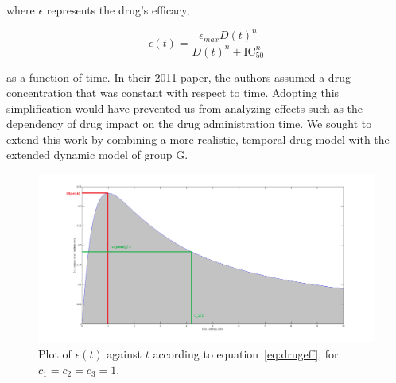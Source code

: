 \documentclass[a4paper, 12pt]{report}
\begin{document}
where $\epsilon$ represents the drug's efficacy,

\begin{equation}
\epsilon(t) = \frac{\epsilon_{max}D(t)^{n}}{D(t)^{n}+\mathrm{IC}^{n}_{50}}
\end{equation}

as a function of time.
In their 2011 paper, the authors assumed a drug concentration that was constant with respect to time. Adopting this simplification would have prevented us from analyzing effects such as the dependency of drug impact on the drug administration time.
We sought to extend this work by combining a more realistic, temporal drug model with the extended dynamic model of group G.\cite{GroupG}

\begin{figure}[htb]
\begin{centering}
\includegraphics[width=150mm]{DrugProfile.png}
\caption{Plot of $\epsilon(t)$ against $t$ according to equation~\eqref{eq:drugeff}, for $c_1 = c_2 = c_3 = 1$.}
\label{fig:DrugProfile}
\end{centering}
\end{figure}
\end{document}
